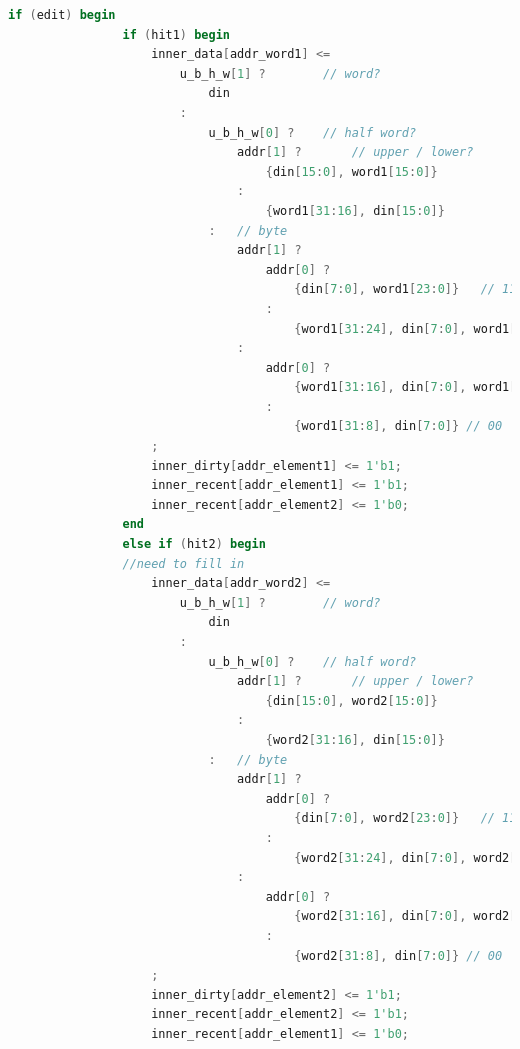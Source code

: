 \begin{lstlisting}[language = {verilog}]
            if (edit) begin
                if (hit1) begin
                    inner_data[addr_word1] <= 
                        u_b_h_w[1] ?        // word?
                            din
                        :
                            u_b_h_w[0] ?    // half word?
                                addr[1] ?       // upper / lower?
                                    {din[15:0], word1[15:0]} 
                                :
                                    {word1[31:16], din[15:0]} 
                            :   // byte
                                addr[1] ?
                                    addr[0] ?
                                        {din[7:0], word1[23:0]}   // 11
                                    :
                                        {word1[31:24], din[7:0], word1[15:0]} // 10
                                :
                                    addr[0] ?
                                        {word1[31:16], din[7:0], word1[7:0]}   // 01
                                    :
                                        {word1[31:8], din[7:0]} // 00
                    ;
                    inner_dirty[addr_element1] <= 1'b1;
                    inner_recent[addr_element1] <= 1'b1;
                    inner_recent[addr_element2] <= 1'b0;
                end
                else if (hit2) begin
                //need to fill in
                    inner_data[addr_word2] <= 
                        u_b_h_w[1] ?        // word?
                            din
                        :
                            u_b_h_w[0] ?    // half word?
                                addr[1] ?       // upper / lower?
                                    {din[15:0], word2[15:0]} 
                                :
                                    {word2[31:16], din[15:0]} 
                            :   // byte
                                addr[1] ?
                                    addr[0] ?
                                        {din[7:0], word2[23:0]}   // 11
                                    :
                                        {word2[31:24], din[7:0], word2[15:0]} // 10
                                :
                                    addr[0] ?
                                        {word2[31:16], din[7:0], word2[7:0]}   // 01
                                    :
                                        {word2[31:8], din[7:0]} // 00
                    ;
                    inner_dirty[addr_element2] <= 1'b1;
                    inner_recent[addr_element2] <= 1'b1;
                    inner_recent[addr_element1] <= 1'b0;
                        

\end{lstlisting}
